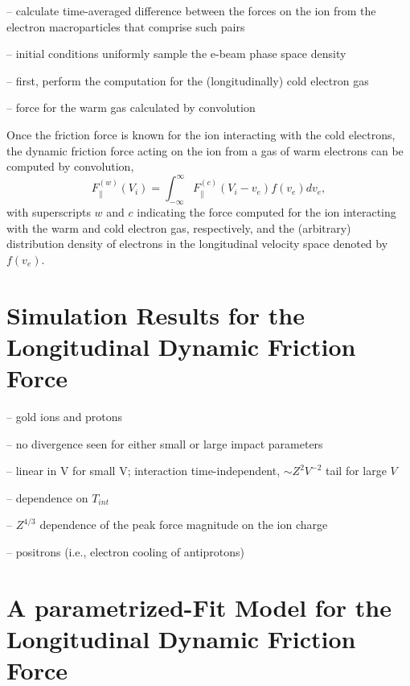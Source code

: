 \documentclass[12pt, reqno]{amsart}
\begin{document}
-- calculate time-averaged difference between the forces on the ion from the electron macroparticles that comprise such pairs 

-- initial conditions uniformly sample the e-beam phase space density 

-- first, perform the computation for the (longitudinally) cold electron gas 

-- force for the warm gas calculated by convolution 

Once the friction force is known for the ion interacting with the cold electrons, the dynamic friction force acting on the ion from a gas of warm electrons can be computed by convolution, 
\begin{equation}
F^{(w)}_{\parallel}(V_i) = \int_{-\infty}^{\infty}  F^{(c)}_{\parallel}(V_i -v_e) f(v_e) dv_e ,
\end{equation}
with superscripts $w$ and $c$ indicating the force computed for the ion interacting with the warm and cold electron gas, respectively, and the (arbitrary) distribution density of electrons in the longitudinal velocity space denoted by $f(v_e)$. 



\section{Simulation Results for the Longitudinal Dynamic Friction Force}

-- gold ions and protons 

-- no divergence seen for either small or large impact parameters 

-- linear in V for small V;  interaction time-independent,  $\sim Z^2 V^{-2} $ tail for large $V$ 

-- dependence on $T_{int}$ 

-- $Z^{4/3}$ dependence of the peak force magnitude on the ion charge  

-- positrons (i.e., electron cooling of antiprotons) 


\section{A parametrized-Fit Model for the Longitudinal Dynamic Friction Force}
\end{document}

